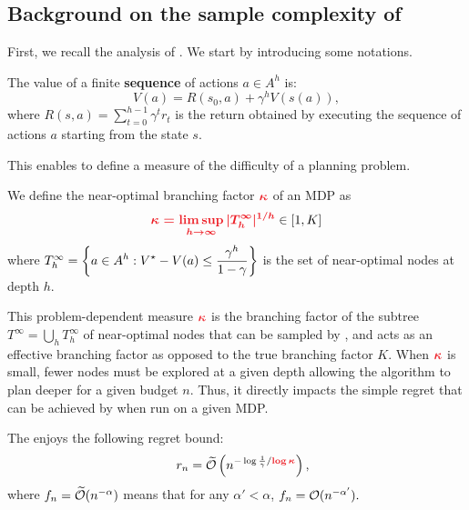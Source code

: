 \documentclass[runningheads]{llncs}
\begin{document}
\subsection{Background on the sample complexity of \OPD}

First, we recall the analysis of \citet{Hren2008optimistic}. We start by introducing some notations.

\begin{definition}
The value of a finite \textbf{sequence} of actions $a\in A^h$ is:
\begin{equation*}
\label{eq:state_value}
    V(a) = R(s_0,a) + \gamma^{h} V(s(a)),
\end{equation*}
where $R(s, a) = \sum_{t=0}^{h-1} \gamma^t r_t$ is the return obtained by executing the sequence of actions $a$ starting from the state $s$.
\end{definition}

This enables to define a measure of the difficulty of a planning problem.

\begin{definition}
We define the near-optimal branching factor $\hlrb{\kappa}$ of an MDP as
\begin{equation}
\hlrb{\kappa = \limsup_{h\rightarrow\infty} |\hlrb{\Tau_h^\infty}|^{1/h}} \in [1, K]
\end{equation}
where $T^\infty_h = \displaystyle \left\{a\in A^h: V^\star-V(a) \leq \frac{\gamma^h}{1-\gamma}\right\}$ is the set of near-optimal nodes at depth $h$.
\end{definition}

This problem-dependent measure $\hlrb{\kappa}$ is the branching factor of the subtree $T^\infty=\bigcup_h T_h^\infty$ of near-optimal nodes that can be sampled by \OPD, and acts as an effective branching factor as opposed to the true branching factor $K$. When $\hlrb{\kappa}$ is small, fewer nodes must be explored at a given depth allowing the algorithm to plan deeper for a given budget $n$. Thus, it directly impacts the simple regret that can be achieved by \OPD when run on a given MDP.


\begin{theorem}
\label{thm:regret-opd}
The  enjoys the following regret bound:
\begin{align*}
\quad r_n = \tilde{\cO}\left( n^{-\log \frac{1}{\gamma}/\hlrb{\log\kappa}}\right),
\end{align*}
where $f_n = \widetilde{\mathcal{O}}(n^{-\alpha})$ means that for any $\alpha'<\alpha$, $f_n = \mathcal{O}(n^{-\alpha'}).$

\end{theorem}
\end{document}
